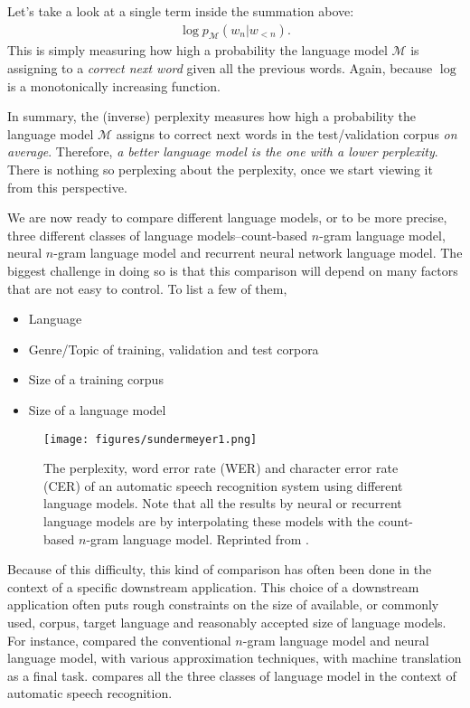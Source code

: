 \documentclass{report}
\newcommand{\MM}[0]{\mathcal{M}}
\begin{document}
Let's take a look at a single term inside the summation above:
\begin{align*}
    \log p_{\MM}(w_n | w_{<n}).
\end{align*}
This is simply measuring how high a probability the language model $\MM$ is
assigning to a {\em correct next word} given all the previous words. Again,
because $\log$ is a monotonically increasing function.

In summary, the (inverse) perplexity measures how high a probability the
language model $\MM$ assigns to correct next words in the test/validation corpus
{\em on average}.  Therefore, {\em a better language model is the one with a lower
perplexity}.  There is nothing so perplexing about the perplexity, once we start
viewing it from this perspective.

We are now ready to compare different language models, or to be more precise,
three different classes of language models--count-based $n$-gram language model,
neural $n$-gram language model and recurrent neural network language model. The
biggest challenge in doing so is that this comparison will depend on many
factors that are not easy to control. To list a few of them,
\begin{itemize}
    \itemsep 0em
    \item Language
    \item Genre/Topic of training, validation and test corpora
    \item Size of a training corpus
    \item Size of a language model
\end{itemize}

\begin{figure}[ht]
    \centering
    \texttt{[image: figures/sundermeyer1.png]}

    \caption{
        The perplexity, word error rate (WER) and character error rate (CER) of
        an automatic speech recognition system using different language models.
        Note that all the results by neural or recurrent language models are by
        interpolating these models with the count-based $n$-gram language model.
        Reprinted from \citet{sundermeyer2015feedforward}.
    }
    \label{fig:sundermeyer1}
\end{figure}

Because of this difficulty, this kind of comparison has often been done in the
context of a specific downstream application. This choice of a downstream
application often puts rough constraints on the size of available, or commonly
used, corpus, target language and reasonably accepted size of language models.
For instance, \citet{baltescu2014pragmatic} compared the
conventional $n$-gram language model and neural language model, with various
approximation techniques, with machine translation as a final task.
\citet{sundermeyer2015feedforward} compares all the three classes of
language model in the context of automatic speech recognition.
\end{document}
